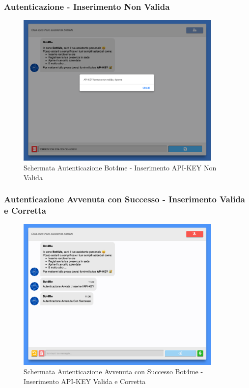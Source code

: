 \newpage

\subsubsection{Autenticazione - Inserimento  Non Valida}
\begin{figure}[H]
    \centering\includegraphics[width=0.9\textwidth, height=0.7\textheight, keepaspectratio]{images/schermata_autenticazione_apikey_non_valida.png}
    \caption{Schermata Autenticazione Bot4me - Inserimento API-KEY Non Valida}
\end{figure}

\subsubsection{Autenticazione Avvenuta con Successo - Inserimento  Valida e Corretta}
\begin{figure}[H]
    \centering\includegraphics[width=0.9\textwidth, height=0.7\textheight, keepaspectratio]{images/schermata_autenticazione_successo.png}
    \caption{Schermata Autenticazione Avvenuta con Successo Bot4me - Inserimento API-KEY Valida e Corretta}
\end{figure}

\newpage